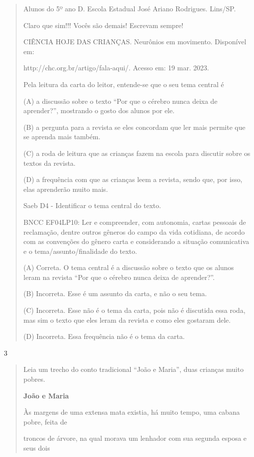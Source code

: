 \begin{escolha}
\begin{escolha}
{\begin{quote}
Alunos do 5º ano D. Escola Estadual José Ariano Rodrigues. Lins/SP.

Claro que sim!!! Vocês são demais! Escrevam sempre!

CIÊNCIA HOJE DAS CRIANÇAS. Neurônios em movimento. Disponível em:

http://chc.org.br/artigo/fala-aqui/. Acesso em: 19 mar. 2023.

Pela leitura da carta do leitor, entende-se que o seu tema central é

(A) a discussão sobre o texto ``Por que o cérebro nunca deixa de
aprender?'', mostrando o gosto dos alunos por ele.

(B) a pergunta para a revista se eles concordam que ler mais permite que
se aprenda mais também.

(C) a roda de leitura que as crianças fazem na escola para discutir
sobre os textos da revista.

(D) a frequência com que as crianças leem a revista, sendo que, por
isso, elas aprenderão muito mais.

Saeb D4 - Identificar o tema central do texto.

BNCC EF04LP10: Ler e compreender, com autonomia, cartas pessoais de
reclamação, dentre outros gêneros do campo da vida cotidiana, de acordo
com as convenções do gênero carta e considerando a situação comunicativa
e o tema/assunto/finalidade do texto.

(A) Correta. O tema central é a discussão sobre o texto que os alunos
leram na revista ``Por que o cérebro nunca deixa de aprender?''.

(B) Incorreta. Esse é um assunto da carta, e não o seu tema.

(C) Incorreta. Esse não é o tema da carta, pois não é discutida essa
roda, mas sim o texto que eles leram da revista e como eles gostaram
dele.

(D) Incorreta. Essa frequência não é o tema da carta.
\end{quote}

\num{3}

\begin{quote}
Leia um trecho do conto tradicional ``João e Maria'', duas crianças
muito pobres.

\textbf{João e Maria}

Às margens de uma extensa mata existia, há muito tempo, uma cabana
pobre, feita de

troncos de árvore, na qual morava um lenhador com sua segunda esposa e
seus dois


\end{quote}}
\end{escolha}
\end{escolha}

